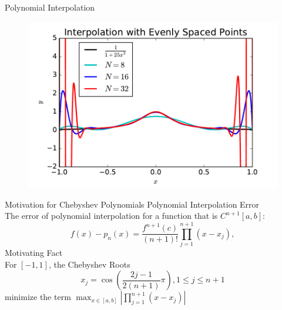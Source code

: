 \documentclass[final]{beamer}
\begin{document}
\begin{frame}[fragile]{}
\begin{columns}[t]
\begin{column}{.31\linewidth}
\begin{block}{Polynomial Interpolation}
\begin{minipage}{.4\linewidth}
\begin{figure}
	\includegraphics[width=\textwidth]{runge_bad.pdf}
	\end{figure}
	\end{minipage}%
\end{block}
\begin{block}{Motivation for Chebyshev Polynomials}
{\color{numhypRed} Polynomial Interpolation Error \cite[Thm.\ 3.1.1]{davis_1975}}\\
The error of polynomial interpolation for a function that is $C^{n+1}[a,b]$:
$$f(x)-p_n(x) = \frac{f^{n+1}(c)}{(n+1)!}\prod_{j=1}^{n+1}(x-x_j),$$														%
{\color{numhypRed}  Motivating Fact \cite[Thm.\ 3.3.4]{davis_1975}}\\
For $[-1,1]$, the Chebyshev Roots
$$x_j=\cos\left(\frac{2j-1}{2(n+1)}\pi\right), 1\leq j\leq n+1$$
minimize the term $\max_{x\in[a,b]}\left|\prod_{j=1}^{n+1}(x-x_j)\right|$
\end{block}



\end{column}
\end{columns}
\end{frame}
\end{document}
